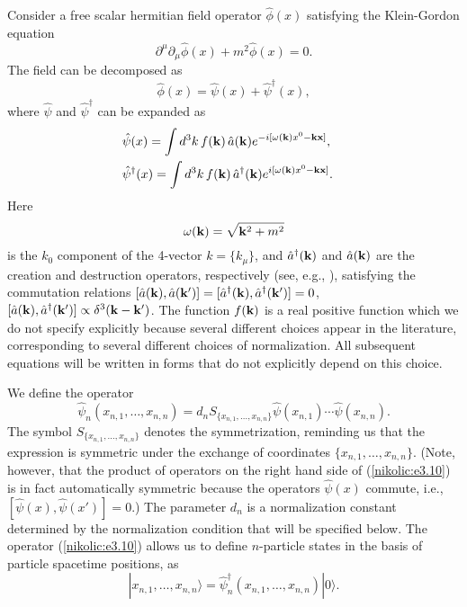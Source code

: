 \documentclass[12pt,twoside]{report} %
\begin{document}
Consider a free scalar hermitian field operator $\hat{\phi}(x)$ satisfying the 
Klein-Gordon equation
\begin{equation}\label{nikolic:e3.7}
 \partial^{\mu}\partial_{\mu}\hat{\phi}(x)+ m^2\hat{\phi}(x) =0. 
\end{equation}
The field can be decomposed as
\begin{equation}\label{nikolic:e3.8}
 \hat{\phi}(x)=\hat{\psi}(x)+\hat{\psi}^{\dagger}(x) ,
\end{equation}
where $\hat{\psi}$ and $\hat{\psi}^{\dagger}$ can be expanded as
\begin{eqnarray}\label{nikolic:e3.9}
& \hat{\psi}(x)=\displaystyle\int d^3k \, f({\bf k}) \, \hat{a}({\bf k})
e^{-i[\omega({\bf k})x^0-{\bf k}{\bf x}]} , &
\nonumber \\
& \hat{\psi}^{\dagger}(x)=\displaystyle\int d^3k \, f({\bf k}) \, \hat{a}^{\dagger}({\bf k})
e^{i[\omega({\bf k})x^0-{\bf k}{\bf x}]} . &
\end{eqnarray}
Here 
\begin{equation}\label{nikolic:e3.9'}
\omega({\bf k})=\sqrt{{\bf k}^2+m^2}
\end{equation} 
is the $k_0$ component
of the 4-vector $k=\{ k_{\mu} \}$, and
$\hat{a}^{\dagger}({\bf k})$ and $\hat{a}({\bf k})$
are the creation and destruction operators, respectively (see, e.g., \cite{bd2}),
satisfying the commutation relations
$[\hat{a}({\bf k}),\hat{a}({\bf k}')]=
[\hat{a}^{\dagger}({\bf k}),\hat{a}^{\dagger}({\bf k}')]=0$,
$[\hat{a}({\bf k}),\hat{a}^{\dagger}({\bf k}')] \propto \delta^3({\bf k}-{\bf k}')$.
The function
$f({\bf k})$ is a real positive function which we do not specify explicitly
because several different choices appear in the literature, corresponding to
several different choices of normalization. All subsequent equations will
be written in forms that do not explicitly depend on this choice.

We define the operator
\begin{equation}\label{nikolic:e3.10}
 \hat{\psi}_n(x_{n,1}, \ldots , x_{n,n}) = d_n 
S_{ \{x_{n,1}, \ldots , x_{n,n} \} } 
\hat{\psi}(x_{n,1}) \cdots \hat{\psi}(x_{n,n}) .
\end{equation}
The symbol $ S_{ \{x_{n,1}, \ldots , x_{n,n} \} }$ denotes the symmetrization, 
reminding us that the expression
is symmetric under the exchange of coordinates $\{x_{n,1}, \ldots , x_{n,n} \}$.
(Note, however, that the product of operators on the right hand side of (\ref{nikolic:e3.10})
is in fact automatically symmetric because 
the operators $\hat{\psi}(x)$ commute, i.e., $[\hat{\psi}(x),\hat{\psi}(x')]=0$.) 
The parameter $d_n$ is a normalization constant determined by the normalization condition
that will be specified below.
The operator (\ref{nikolic:e3.10}) allows us to define $n$-particle states
in the basis of particle spacetime positions, as
\begin{equation}\label{nikolic:e3.11}
 |x_{n,1}, \ldots , x_{n,n}\rangle = \hat{\psi}^{\dagger}_n(x_{n,1}, \ldots , x_{n,n})
|0\rangle .
\end{equation}
\end{document}
